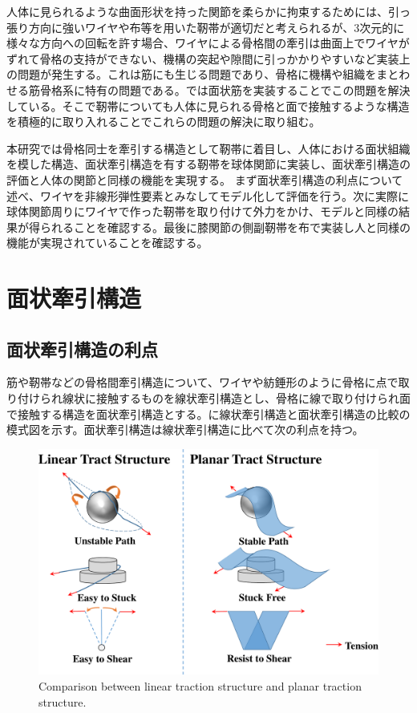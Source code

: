 \documentclass{jarticle}
\begin{document}
人体に見られるような曲面形状を持った関節を柔らかに拘束するためには、引っ張り方向に強いワイヤや布等を用いた靭帯が適切だと考えられるが、3次元的に様々な方向への回転を許す場合、ワイヤによる骨格間の牽引は曲面上でワイヤがずれて骨格の支持ができない、機構の突起や隙間に引っかかりやすいなど実装上の問題が発生する。これは筋にも生じる問題であり、骨格に機構や組織をまとわせる筋骨格系に特有の問題である。\cite{Humanoids2011:osada:planar}では面状筋を実装することでこの問題を解決している。そこで靭帯についても人体に見られる骨格と面で接触するような構造を積極的に取り入れることでこれらの問題の解決に取り組む。

本研究では骨格同士を牽引する構造として靭帯に着目し、人体における面状組織を模した構造、面状牽引構造を有する靭帯を球体関節に実装し、面状牽引構造の評価と人体の関節と同様の機能を実現する。
まず面状牽引構造の利点について述べ、ワイヤを非線形弾性要素とみなしてモデル化して評価を行う。次に実際に球体関節周りにワイヤで作った靭帯を取り付けて外力をかけ、モデルと同様の結果が得られることを確認する。最後に膝関節の側副靭帯を布で実装し人と同様の機能が実現されていることを確認する。

\section{面状牽引構造}
\subsection{面状牽引構造の利点}
筋や靭帯などの骨格間牽引構造について、ワイヤや紡錘形のように骨格に点で取り付けられ線状に接触するものを線状牽引構造とし、骨格に線で取り付けられ面で接触する構造を面状牽引構造とする。に線状牽引構造と面状牽引構造の比較の模式図を示す。面状牽引構造は線状牽引構造に比べて次の利点を持つ。

\begin{figure}[tb]
 \centering
  \includegraphics[width=1.0\columnwidth]{figs/schematic-comparison-of-structure.pdf}
  \vspace*{-4mm}
  \caption{Comparison between linear traction structure and planar traction structure.}
  \label{fig:schema}
\end{figure}
\end{document}
